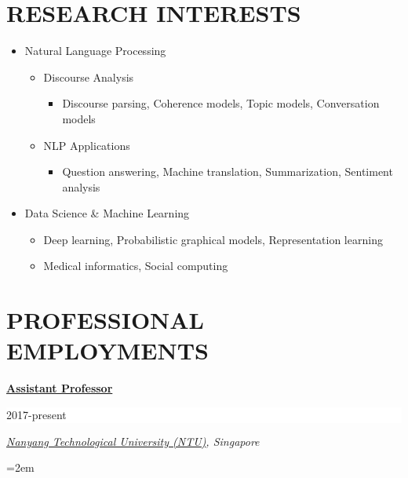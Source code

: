 \documentclass[paper=letter,fontsize=11pt]{scrartcl} %
\newcommand{\NewPart}[2]{\section*{\uppercase{#1} #2}}
\newcommand{\EducationEntry}[4]{
		\noindent \textbf{#1} \hfill      %
		\colorbox{White}{%
			\parbox{6em}{%
			\hfill\color{Black}#2}} \par  %
		\noindent \textit{#3} \par        %
		\noindent\hangindent=2em\hangafter=0 \small #4 %
		\normalsize \par}
\begin{document}
\NewPart{Research Interests}{}
\begin{itemize}
 \item Natural Language Processing
   \begin{itemize}

	\item Discourse Analysis 
		\begin{itemize}
 		\item Discourse parsing, Coherence models, Topic models, Conversation models 
    	\end{itemize}
	\item NLP Applications 

      \begin{itemize}
      \item Question answering, Machine translation, Summarization, Sentiment analysis      
      \end{itemize}

   \end{itemize}
 	
 \item Data Science \& Machine Learning

	\begin{itemize}
 	\item Deep learning, Probabilistic graphical models, Representation learning
 	\item Medical informatics, Social computing
    \end{itemize}


\end{itemize}

\NewPart{PROFESSIONAL EMPLOYMENTS}{}

\EducationEntry{\href{https://raihanjoty.github.io/}{Assistant Professor}}{2017-present}{\href{http://www.ntu.edu.sg/Pages/home.aspx} {Nanyang Technological University (NTU)}, Singapore}{}
\end{document}
